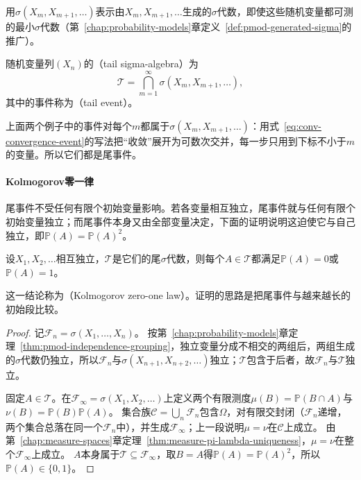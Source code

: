 用$\sigma(X_m,X_{m+1},\ldots)$表示由$X_m,X_{m+1},\ldots$生成的$\sigma$代数，即使这些随机变量都可测的最小$\sigma$代数（第~\ref{chap:probability-models}章定义~\ref{def:pmod-generated-sigma}的推广）。

\begin{definition}[尾$\sigma$代数]
\label{def:conv-tail-sigma}
随机变量列$(X_n)$的（tail sigma-algebra）为
\[
  \mathcal T=\bigcap_{m=1}^{\infty}\sigma(X_m,X_{m+1},\ldots),
\]
其中的事件称为（tail event）。
\end{definition}

上面两个例子中的事件对每个$m$都属于$\sigma(X_m,X_{m+1},\ldots)$：用式~\eqref{eq:conv-convergence-event}的写法把“收敛”展开为可数次交并，每一步只用到下标不小于$m$的变量。所以它们都是尾事件。

\paragraph{Kolmogorov零一律}
尾事件不受任何有限个初始变量影响。若各变量相互独立，尾事件就与任何有限个初始变量独立；而尾事件本身又由全部变量决定，下面的证明说明这迫使它与自己独立，即$\mathbb P(A)=\mathbb P(A)^2$。

\begin{theorem}[Kolmogorov零一律]
\label{thm:conv-zero-one}
设$X_1,X_2,\ldots$相互独立，$\mathcal T$是它们的尾$\sigma$代数，则每个$A\in\mathcal T$都满足$\mathbb P(A)=0$或$\mathbb P(A)=1$。
\end{theorem}

这一结论称为（Kolmogorov zero-one law）。证明的思路是把尾事件与越来越长的初始段比较。

\begin{proof}
记$\mathcal F_n=\sigma(X_1,\ldots,X_n)$。
按第~\ref{chap:probability-models}章定理~\ref{thm:pmod-independence-grouping}，独立变量分成不相交的两组后，两组生成的$\sigma$代数仍独立，所以$\mathcal F_n$与$\sigma(X_{n+1},X_{n+2},\ldots)$独立；$\mathcal T$包含于后者，故$\mathcal F_n$与$\mathcal T$独立。

固定$A\in\mathcal T$。在$\mathcal F_\infty=\sigma(X_1,X_2,\ldots)$上定义两个有限测度$\mu(B)=\mathbb P(B\cap A)$与$\nu(B)=\mathbb P(B)\mathbb P(A)$。
集合族$\mathcal C=\bigcup_n\mathcal F_n$包含$\Omega$，对有限交封闭（$\mathcal F_n$递增，两个集合总落在同一个$\mathcal F_n$中），并生成$\mathcal F_\infty$；上一段说明$\mu=\nu$在$\mathcal C$上成立。
由第~\ref{chap:measure-spaces}章定理~\ref{thm:measure-pi-lambda-uniqueness}，$\mu=\nu$在整个$\mathcal F_\infty$上成立。
$A$本身属于$\mathcal T\subseteq\mathcal F_\infty$，取$B=A$得$\mathbb P(A)=\mathbb P(A)^2$，所以$\mathbb P(A)\in\{0,1\}$。
\end{proof}

